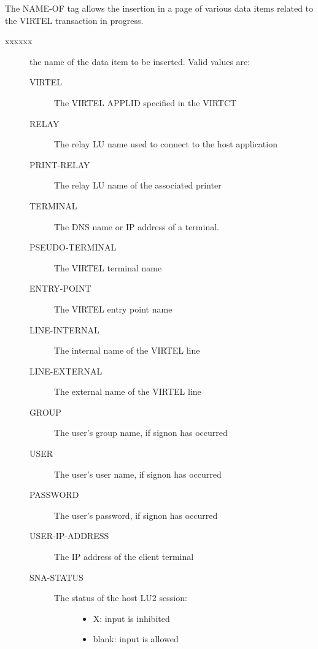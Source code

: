 \documentclass[letterpaper,10pt,english]{sphinxmanual}
\begin{document}
The NAME-OF tag allows the insertion in a page of various data items related to the VIRTEL transaction in progress.
\begin{description}
\item[{xxxxxx}] \leavevmode
the name of the data item to be inserted. Valid values are:
\begin{description}
\item[{VIRTEL}] \leavevmode
The VIRTEL APPLID specified in the VIRTCT

\item[{RELAY}] \leavevmode
The relay LU name used to connect to the host application

\item[{PRINT-RELAY}] \leavevmode
The relay LU name of the associated printer

\item[{TERMINAL}] \leavevmode
The DNS name or IP address of a terminal.

\item[{PSEUDO-TERMINAL}] \leavevmode
The VIRTEL terminal name

\item[{ENTRY-POINT}] \leavevmode
The VIRTEL entry point name

\item[{LINE-INTERNAL}] \leavevmode
The internal name of the VIRTEL line

\item[{LINE-EXTERNAL}] \leavevmode
The external name of the VIRTEL line

\item[{GROUP}] \leavevmode
The user’s group name, if signon has occurred

\item[{USER}] \leavevmode
The user’s user name, if signon has occurred

\item[{PASSWORD}] \leavevmode
The user’s password, if signon has occurred

\item[{USER-IP-ADDRESS}] \leavevmode
The IP address of the client terminal

\item[{SNA-STATUS}] \leavevmode\begin{description}
\item[{The status of the host LU2 session:}] \leavevmode\begin{itemize}
\item {} 
X: input is inhibited

\item {} 
blank: input is allowed


\end{itemize}
\end{description}
\end{description}
\end{description}
\end{document}
